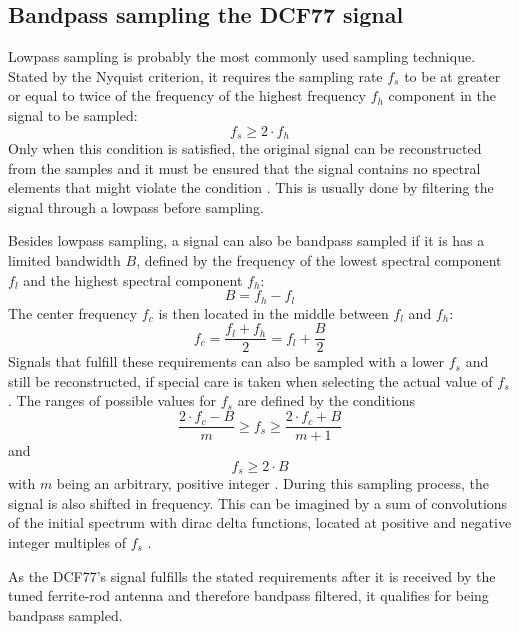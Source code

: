 \documentclass[conference]{IEEEtran}
\begin{document}
\subsection{Bandpass sampling the DCF77 signal}
Lowpass sampling is probably the most commonly used sampling technique.
Stated by the Nyquist criterion, it requires the sampling rate $f_{s}$ to be at greater or equal to twice of the frequency of the highest frequency $f_{h}$ component in the
signal to be sampled:
\begin{equation}
    f_{s} \geq 2 \cdot f_{h}
\end{equation}
Only when this condition is satisfied, the original signal can be reconstructed from the samples and it must be ensured that the signal contains no spectral elements
that might violate the condition \cite{b6}.
This is usually done by filtering the signal through a lowpass before sampling.
\par
Besides lowpass sampling, a signal can also be bandpass sampled if it is has a limited bandwidth $B$, defined by the frequency of the lowest spectral component $f_{l}$ and
the highest spectral component $f_{h}$:
\begin{equation}
    B = f_{h} - f_{l}
\end{equation}
The center frequency $f_{c}$ is then located in the middle between $f_{l}$ and $f_{h}$:
\begin{equation}
    f_{c} = \frac{f_{l} + f_{h}}{2} = f_{l} + \frac{B}{2}
\end{equation}
Signals that fulfill these requirements can also be sampled with a lower $f_{s}$ and still be reconstructed, if special care is taken when selecting the actual value of $f_{s}$.
The ranges of possible values for $f_{s}$ are defined by the conditions
\begin{equation}
    \frac{2 \cdot f_{c} - B}{m} \geq f_{s} \geq \frac{2 \cdot f_{c} + B}{m + 1} \label{eqn:fs}
\end{equation}
and
\begin{equation}
    f_{s} \geq 2 \cdot B \label{eqn:fs_b}
\end{equation}
with $m$ being an arbitrary, positive integer \cite{b6}.
During this sampling process, the signal is also shifted in frequency. This can be imagined
by a sum of convolutions of the initial spectrum with dirac delta functions, located at
positive and negative integer multiples of $f_{s}$ \cite{b9}.
\par
As the DCF77's signal fulfills the stated requirements after it is received by the tuned ferrite-rod antenna and therefore bandpass filtered, it qualifies for being bandpass sampled.
\end{document}
